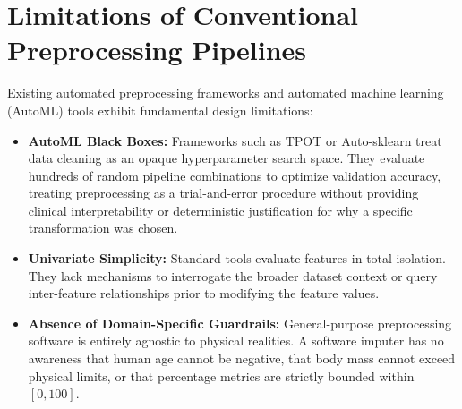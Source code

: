 \documentclass[MTech]{ugthesis}
\begin{document}
\section{Limitations of Conventional Preprocessing Pipelines}
Existing automated preprocessing frameworks and automated machine learning (AutoML) tools exhibit fundamental design limitations:
\begin{itemize}
    \item \textbf{AutoML Black Boxes:} Frameworks such as TPOT or Auto-sklearn treat data cleaning as an opaque hyperparameter search space. They evaluate hundreds of random pipeline combinations to optimize validation accuracy, treating preprocessing as a trial-and-error procedure without providing clinical interpretability or deterministic justification for why a specific transformation was chosen.
    \item \textbf{Univariate Simplicity:} Standard tools evaluate features in total isolation. They lack mechanisms to interrogate the broader dataset context or query inter-feature relationships prior to modifying the feature values.
    \item \textbf{Absence of Domain-Specific Guardrails:} General-purpose preprocessing software is entirely agnostic to physical realities. A software imputer has no awareness that human age cannot be negative, that body mass cannot exceed physical limits, or that percentage metrics are strictly bounded within $[0, 100]$.
\end{itemize}
\end{document}
